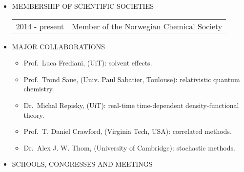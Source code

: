 \documentclass[notitlepage,a4paper,11pt]{article}
\begin{document}
\begin{itemize}
\item MEMBERSHIP OF SCIENTIFIC SOCIETIES

  \begin{tabular}{lp{12cm}}
2014 - present  & Member of the Norwegian Chemical Society \\
  \end{tabular}

\item MAJOR COLLABORATIONS

  \begin{itemize}
  \item Prof.~Luca Frediani, (UiT): solvent effects.
  \item Prof.~Trond Saue, (Univ. Paul Sabatier, Toulouse): relativistic quantum chemistry.
  \item Dr.~Michal Repisky, (UiT): real-time time-dependent density-functional theory.
  \item Prof.~T. Daniel Crawford, (Virginia Tech, USA): correlated methods.
  \item Dr.~Alex J. W. Thom, (University of Cambridge): stochastic methods.
  \end{itemize}

\item SCHOOLS, CONGRESSES AND MEETINGS


\end{itemize}
\end{document}

